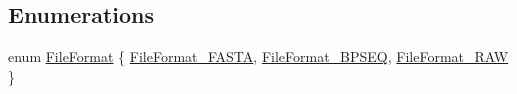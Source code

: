 \subsection*{Enumerations}
\begin{DoxyCompactItemize}
\item 
enum \hyperlink{namespace_c_o_n_t_r_a_l_i_g_n_a64bb6a3c7f6fb72e96a45b590f2fb825}{File\+Format} \{ \hyperlink{namespace_c_o_n_t_r_a_l_i_g_n_a64bb6a3c7f6fb72e96a45b590f2fb825a1978f4cc2e8d5cb064896f9be0f5f8df}{File\+Format\+\_\+\+F\+A\+S\+T\+A}, 
\hyperlink{namespace_c_o_n_t_r_a_l_i_g_n_a64bb6a3c7f6fb72e96a45b590f2fb825ac6b4ba8a4576509ebb7d1ebc69820cec}{File\+Format\+\_\+\+B\+P\+S\+E\+Q}, 
\hyperlink{namespace_c_o_n_t_r_a_l_i_g_n_a64bb6a3c7f6fb72e96a45b590f2fb825aef388571170761c3a03c13f7ce77e2ca}{File\+Format\+\_\+\+R\+A\+W}
 \}
\end{DoxyCompactItemize}
